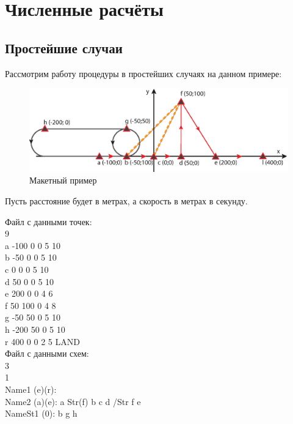 \documentclass[12pt, a4 paper]{article}
\begin{document}


\section{Численные расчёты}
\subsection{Простейшие случаи}

Рассмотрим работу процедуры в простейших случаях на данном примере:

\begin{figure}[h]
  \begin{center}
      \includegraphics[scale=1]{Example.eps}
        \caption{Макетный пример}                                                                             
  \end{center}
\end{figure}

Пусть расстояние будет в метрах, а скорость в метрах в секунду.

\noindent Файл с данными точек:\\
9\\
a -100 0 0 5 10\\
b -50 0 0 5 10\\
c 0 0 0 5 10\\
d 50 0 0 5 10\\
e 200 0 0 4 6\\
f 50 100 0 4 8\\
g -50 50 0 5 10\\
h -200 50 0 5 10\\
r 400 0 0 2 5 LAND\\

\noindent Файл с данными схем:\\
3\\
1\\
Name1 (e)(r):\\
Name2 (a)(e): a Str(f) b c d /Str f e\\
NameSt1 (0): b g h\\
\end{document}
